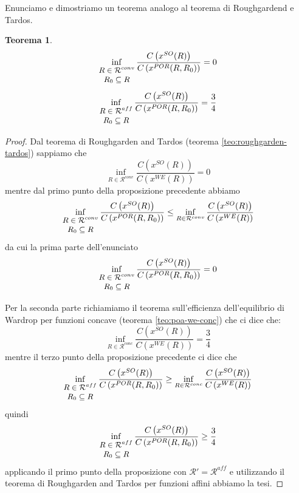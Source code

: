 \documentclass[a4paper]{article}
\theoremstyle{plain}
\newtheorem{myteo}{Teorema}[section]
\theoremstyle{definition}
\theoremstyle{remark}
\newcommand{\pa}[1]{\left(#1\right)}
\begin{document}
Enunciamo e dimostriamo un teorema analogo al teorema di Roughgardend
e Tardos.
\begin{myteo}
\label{teo:poa-por}
  \[ \inf _{\small\begin{matrix}R\in \mathcal{R}^{conv}\\R_0\subseteq
        R\end{matrix}}
    \frac{C\pa{x^{SO}(R)}}{C\pa{x^{POR}(R,R_0)}} = 0\]    
  \[ \inf _{\small\begin{matrix}R\in \mathcal{R}^{aff}\\R_0\subseteq
        R\end{matrix}}
    \frac{C\pa{x^{SO}(R)}}{C\pa{x^{POR}(R,R_0)}} = \frac{3}{4} \]    
\end{myteo}
\begin{proof}
  Dal teorema di Roughgarden and Tardos (teorema
  \ref{teo:roughgarden-tardos}) sappiamo che 
  \[ \inf _{R\in \mathcal{R}^{conv}} \frac{C\pa{ x^{SO}(R)}}{C\pa{
        x^{WE}(R)}} = 0 \]
  mentre dal primo punto della proposizione precedente abbiamo
  \[ \inf _{\small\begin{matrix}R\in \mathcal{R}^{conv}\\R_0\subseteq
        R\end{matrix}}
    \frac{C\pa{x^{SO}(R)}}{C\pa{x^{POR}(R,R_0)}} \le
    \inf _{R\in \mathcal{R}^{conv}}
    \frac{C\pa{x^{SO}(R)}}{C\pa{x^{WE}(R)}}
  \]
  da cui la prima parte dell'enunciato
  \[ \inf _{\small\begin{matrix}R\in \mathcal{R}^{conv}\\R_0\subseteq
        R\end{matrix}}
    \frac{C\pa{x^{SO}(R)}}{C\pa{x^{POR}(R,R_0)}} = 0\]    
  
  Per la seconda parte richiamiamo il teorema sull'efficienza
  dell'equilibrio di Wardrop per funzioni concave (teorema
  \ref{teo:poa-we-conc}) che ci dice che:
  \[ \inf _{R\in \mathcal{R}^{conc}} \frac{C\pa{ x^{SO}(R)}}{C\pa{
        x^{WE}(R)}} = \frac{3}{4} \]
  mentre il terzo punto della proposizione precedente ci dice che
  \[ \inf _{\small\begin{matrix}R\in \mathcal{R}^{aff}\\R_0\subseteq
        R\end{matrix}}
    \frac{C\pa{x^{SO}(R)}}{C\pa{x^{POR}(R,R_0)}} \ge
    \inf _{R\in \mathcal{R}^{conc}}
    \frac{C\pa{x^{SO}(R)}}{C\pa{x^{WE}(R)}}
  \]
  quindi
  \[ \inf _{\small\begin{matrix}R\in \mathcal{R}^{aff}\\R_0\subseteq
        R\end{matrix}}
    \frac{C\pa{x^{SO}(R)}}{C\pa{x^{POR}(R,R_0)}} \ge \frac{3}{4} \]    
  applicando il primo punto della proposizione con $\mathcal{R}' =
  \mathcal{R}^{aff}$ e utilizzando il teorema di Roughgarden and
  Tardos per funzioni affini abbiamo la tesi.
\end{proof}
\end{document}
